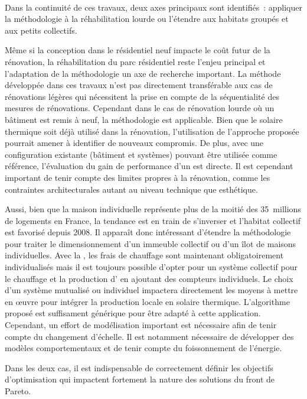\paragraph{} %
Dans la continuité de ces travaux, deux axes principaux sont identifiés~: appliquer la
méthodologie à la réhabilitation lourde ou l’étendre aux habitats groupés et aux petits
collectifs.

Même si la conception dans le résidentiel neuf impacte le coût futur de la rénovation, la
réhabilitation du parc résidentiel reste l’enjeu principal et l’adaptation de la
méthodologie un axe de recherche important. La méthode développée dans ces travaux n’est
pas directement transférable aux cas de rénovations légères qui nécessitent la prise en
compte de la séquentialité des mesures de rénovations. Cependant dans le cas de rénovation
lourde où un bâtiment est remis à neuf, la méthodologie est applicable. Bien que le
solaire thermique soit déjà utilisé dans la rénovation, l’utilisation de l’approche
proposée pourrait amener à identifier de nouveaux compromis. De plus, avec une
configuration existante (bâtiment et systèmes) pouvant être utilisée comme référence,
l’évaluation du gain de performance d’un  est directe. Il est cependant important
de tenir compte des limites propres à la rénovation, comme les contraintes architecturales
autant au niveau technique que esthétique.

Aussi, bien que la maison individuelle représente plus de la moitié des
\SI{35}{millions} de logements en France, la tendance est en train de s’inverser
et l’habitat collectif est favorisé depuis \num{2008}. Il apparaît donc intéressant
d’étendre la méthodologie pour traiter le dimensionnement d’un immeuble collectif ou d’un
îlot de maisons individuelles. Avec la , les frais de chauffage sont
maintenant obligatoirement individualisés mais il est toujours possible d’opter pour un
système collectif pour le chauffage et la production d’ en ajoutant des compteurs
individuels. Le choix d’un système mutualisé ou individuel impactera
directement les moyens à mettre en œuvre pour intégrer la production locale en solaire
thermique.
L’algorithme proposé est suffisament générique pour être adapté à cette
application. Cependant, un effort de modélisation important est nécessaire afin de tenir
compte du changement d’échelle. Il est notamment nécessaire de développer des modèles
comportementaux et de tenir compte du foissonnement de l’énergie.

Dans les deux cas, il est indispensable de correctement définir les objectifs
d’optimisation qui impactent fortement la nature des solutions du front de Pareto.



